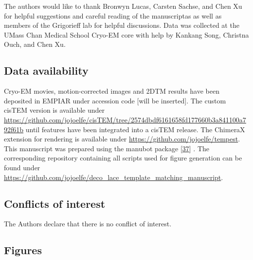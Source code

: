 \documentclass[
]{article}
\begin{document}
The authors would like to thank Bronwyn Lucas, Carsten Sachse, and Chen Xu for helpful suggestions and careful reading of the manuscriptas as well as members of the Grigorieff lab for helpful discussions. Data was collected at the UMass Chan Medical School Cryo-EM core with help by Kankang Song, Christna Ouch, and Chen Xu.

\hypertarget{data-availability}{%
\subsection{Data availability}\label{data-availability}}

Cryo-EM movies, motion-corrected images and 2DTM results have been deposited in EMPIAR under accession code {[}will be inserted{]}. The custom cisTEM version is available under \url{https://github.com/jojoelfe/cisTEM/tree/2574dbdf6161658fd177660b3a841100a792f61b} until features have been integrated into a cisTEM release. The ChimeraX extension for rendering is available under \url{https://github.com/jojoelfe/tempest}. This manuscript was prepared using the manubot package {[}\protect\hyperlink{ref-YuJbg3zO}{37}{]} . The corresponding repository containing all scripts used for figure generation can be found under \url{https://github.com/jojoelfe/deco_lace_template_matching_manuscript}.

\hypertarget{conflicts-of-interest}{%
\subsection{Conflicts of interest}\label{conflicts-of-interest}}

The Authors declare that there is no conflict of interest.

\hypertarget{figures}{%
\subsection{Figures}\label{figures}}
\end{document}
